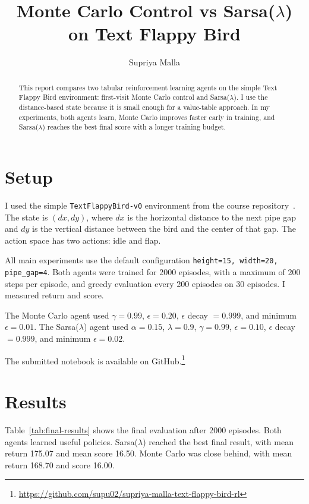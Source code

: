 \documentclass[runningheads]{llncs}
\title{Monte Carlo Control vs Sarsa($\lambda$) on Text Flappy Bird}
\author{Supriya Malla}
\institute{3MD3220 -- Reinforcement Learning}
\begin{document}
\maketitle

\begin{abstract}
This report compares two tabular reinforcement learning agents on the simple
Text Flappy Bird environment: first-visit Monte Carlo control and
Sarsa($\lambda$). I use the distance-based state because it is small enough for
a value-table approach. In my experiments, both agents learn, Monte Carlo
improves faster early in training, and Sarsa($\lambda$) reaches the best final
score with a longer training budget.
\end{abstract}

\section{Setup}

I used the simple \texttt{TextFlappyBird-v0} environment from the course
repository~\cite{textflappybird}. The state is $(dx,dy)$, where $dx$ is the
horizontal distance to the next pipe gap and $dy$ is the vertical distance
between the bird and the center of that gap. The action space has two actions:
idle and flap.

All main experiments use the default configuration
\texttt{height=15, width=20, pipe\_gap=4}. Both agents were trained for 2000
episodes, with a maximum of 200 steps per episode, and greedy evaluation every
200 episodes on 30 episodes. I measured return and score.

The Monte Carlo agent used $\gamma=0.99$, $\epsilon=0.20$,
$\epsilon$ decay $=0.999$, and minimum $\epsilon=0.01$.
The Sarsa($\lambda$) agent used $\alpha=0.15$, $\lambda=0.9$,
$\gamma=0.99$, $\epsilon=0.10$, $\epsilon$ decay $=0.999$, and minimum
$\epsilon=0.02$.

The submitted notebook is available on GitHub.\footnote{\url{https://github.com/supu02/supriya-malla-text-flappy-bird-rl}}

\section{Results}

Table~\ref{tab:final-results} shows the final evaluation after 2000 episodes.
Both agents learned useful policies. Sarsa($\lambda$) reached the best final
result, with mean return 175.07 and mean score 16.50. Monte Carlo was close
behind, with mean return 168.70 and score 16.00.
\end{document}
